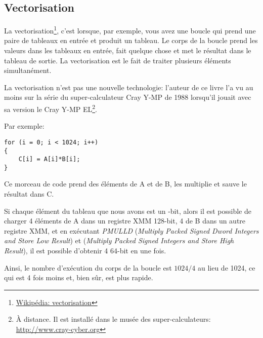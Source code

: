 ﻿\subsection{Vectorisation}

\newcommand{\URLVEC}{\href{http://en.wikipedia.org/wiki/Vectorization_(computer_science)}{Wikipédia: vectorisation}}

La vectorisation\footnote{\URLVEC}, c'est lorsque, par exemple, vous avez une boucle
qui prend une paire de tableaux en entrée et produit un tableau.
Le corps de la boucle prend les valeurs dans les tableaux en entrée, fait quelque
chose et met le résultat dans le tableau de sortie.
La vectorisation est le fait de traiter plusieurs éléments simultanément.

La vectorisation n'est pas une nouvelle technologie: l'auteur de ce livre l'a vu
au moins sur la série du super-calculateur Cray Y-MP de 1988 lorsqu'il jouait avec
sa version  le Cray Y-MP EL\footnote{À distance. Il est installé dans le
musée des super-calculateurs: \url{http://www.cray-cyber.org}}.

Par exemple:

\begin{lstlisting}[style=customc]
for (i = 0; i < 1024; i++)
{
    C[i] = A[i]*B[i];
}
\end{lstlisting}

Ce morceau de code prend des éléments de A et de B, les multiplie et sauve le résultat
dans C.

\newcommand{\PMULLD}{\emph{PMULLD} (\emph{Multiply Packed Signed Dword Integers and Store Low Result})}
\newcommand{\PMULHW}{\TT{PMULHW} (\emph{Multiply Packed Signed Integers and Store High Result})}

Si chaque élément du tableau que nous avons est un -bit, alors il est possible
de charger 4 éléments de A dans un registre XMM 128-bit, 4 de B dans un autre registre
XMM, et en exécutant \PMULLD{} et \PMULHW{}, il est possible d'obtenir 4 
64-bit en une fois.

Ainsi, le nombre d'exécution du corps de la boucle est $1024/4$ au lieu de 1024,
ce qui est 4 fois moins et, bien sûr, est plus rapide.

\newcommand{\URLINTELVEC}{\href{http://www.intel.com/intelpress/sum_vmmx.htm}{Extrait: Vectorisation automatique efficace}}

